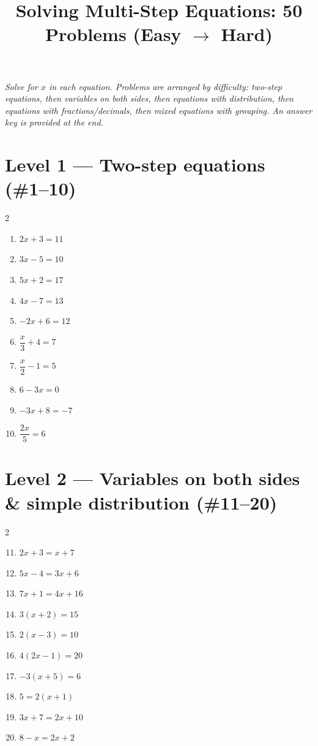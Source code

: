 \documentclass[11pt]{article}
\title{Solving Multi-Step Equations: 50 Problems (Easy $\to$ Hard)}
\author{}
\date{}
\begin{document}
\maketitle

\noindent\textit{Solve for $x$ in each equation. Problems are arranged by difficulty: two-step equations, then variables on both sides, then equations with distribution, then equations with fractions/decimals, then mixed equations with grouping. An answer key is provided at the end.}

\bigskip
\section*{Level 1 \;—\; Two-step equations (\#1--10)}
\begin{multicols}{2}
\begin{enumerate}
  \item $2x + 3 = 11$
  \item $3x - 5 = 10$
  \item $5x + 2 = 17$
  \item $4x - 7 = 13$
  \item $-2x + 6 = 12$
  \item $\dfrac{x}{3} + 4 = 7$
  \item $\dfrac{x}{2} - 1 = 5$
  \item $6 - 3x = 0$
  \item $-3x + 8 = -7$
  \item $\dfrac{2x}{5} = 6$
\end{enumerate}
\end{multicols}

\section*{Level 2 \;—\; Variables on both sides \& simple distribution (\#11--20)}
\begin{multicols}{2}
\begin{enumerate}\setcounter{enumi}{10}
  \item $2x + 3 = x + 7$
  \item $5x - 4 = 3x + 6$
  \item $7x + 1 = 4x + 16$
  \item $3(x + 2) = 15$
  \item $2(x - 3) = 10$
  \item $4(2x - 1) = 20$
  \item $-3(x + 5) = 6$
  \item $5 = 2(x + 1)$
  \item $3x + 7 = 2x + 10$
  \item $8 - x = 2x + 2$
\end{enumerate}
\end{multicols}
\end{document}
